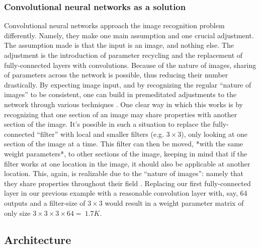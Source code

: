\subsubsection{Convolutional neural networks as a solution}
Convolutional neural networks approach the image recognition problem differently. Namely, they make one main assumption and one crucial adjustment. The assumption made is that the input is an image, and nothing else. The adjustment is the introduction of parameter recycling and the replacement of fully-connected layers with convolutions. Because of the nature of images, sharing of parameters across the network is possible, thus reducing their number drastically. By expecting image input, and by recognizing the regular ``nature of images'' to be consistent, one can build in premeditated adjustments to the network through various techniques \cite{convnets}. One clear way in which this works is by recognizing that one section of an image may share properties with another section of the image. It's possible in such a situation to replace the fully-connected ``filter'' with local and smaller filters (e.g. $3\times3$), only looking at one section of the image at a time. This filter can then be moved, *with the same weight parameters*, to other sections of the image, keeping in mind that if the filter works at one location in the image, it should also be applicable at another location. This, again, is realizable due to the ``nature of images'': namely that they share properties throughout their field \cite{convnets}. Replacing our first fully-connected layer in our previous example with a reasonable convolution layer with, say, 64 outputs and a filter-size of $3\times3$ would result in a weight parameter matrix of only size $3\times3\times3\times64 = ~1.7K$.


\subsection{Architecture}
